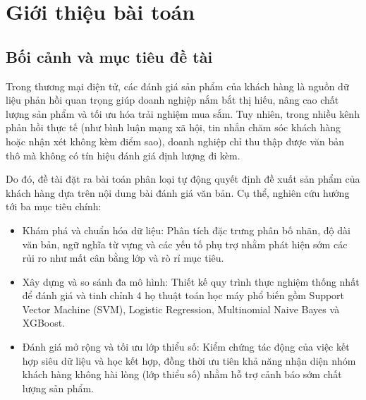 \section{Giới thiệu bài toán}

\subsection{Bối cảnh và mục tiêu đề tài}
Trong thương mại điện tử, các đánh giá sản phẩm của khách hàng là nguồn dữ liệu phản hồi quan trọng giúp doanh nghiệp nắm bắt thị hiếu, nâng cao chất lượng sản phẩm và tối ưu hóa trải nghiệm mua sắm. Tuy nhiên, trong nhiều kênh phản hồi thực tế (như bình luận mạng xã hội, tin nhắn chăm sóc khách hàng hoặc nhận xét không kèm điểm sao), doanh nghiệp chỉ thu thập được văn bản thô mà không có tín hiệu đánh giá định lượng đi kèm.

Do đó, đề tài đặt ra bài toán phân loại tự động quyết định đề xuất sản phẩm của khách hàng dựa trên nội dung bài đánh giá văn bản. Cụ thể, nghiên cứu hướng tới ba mục tiêu chính:
\begin{itemize}
    \item Khám phá và chuẩn hóa dữ liệu: Phân tích đặc trưng phân bố nhãn, độ dài văn bản, ngữ nghĩa từ vựng và các yếu tố phụ trợ nhằm phát hiện sớm các rủi ro như mất cân bằng lớp và rò rỉ mục tiêu.
    \item Xây dựng và so sánh đa mô hình: Thiết kế quy trình thực nghiệm thống nhất để đánh giá và tinh chỉnh 4 họ thuật toán học máy phổ biến gồm Support Vector Machine (SVM), Logistic Regression, Multinomial Naive Bayes và XGBoost.
    \item Đánh giá mở rộng và tối ưu lớp thiểu số: Kiểm chứng tác động của việc kết hợp siêu dữ liệu và học kết hợp, đồng thời ưu tiên khả năng nhận diện nhóm khách hàng không hài lòng (lớp thiểu số) nhằm hỗ trợ cảnh báo sớm chất lượng sản phẩm.
\end{itemize}

